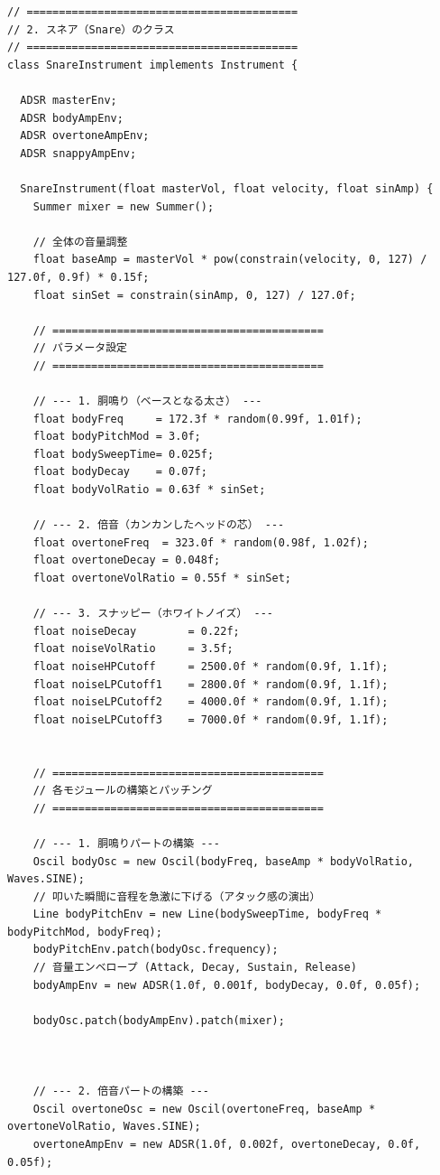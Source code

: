 \begin{lstlisting}[caption={Drum.pde}, label={lst:proc_drum}]
// ==========================================
// 2. スネア（Snare）のクラス
// ==========================================
class SnareInstrument implements Instrument {
  
  ADSR masterEnv;
  ADSR bodyAmpEnv;
  ADSR overtoneAmpEnv;
  ADSR snappyAmpEnv;

  SnareInstrument(float masterVol, float velocity, float sinAmp) {
    Summer mixer = new Summer();
    
    // 全体の音量調整
    float baseAmp = masterVol * pow(constrain(velocity, 0, 127) / 127.0f, 0.9f) * 0.15f; 
    float sinSet = constrain(sinAmp, 0, 127) / 127.0f;
    
    // ==========================================
    // パラメータ設定
    // ==========================================
    
    // --- 1. 胴鳴り（ベースとなる太さ） ---
    float bodyFreq     = 172.3f * random(0.99f, 1.01f);
    float bodyPitchMod = 3.0f;
    float bodySweepTime= 0.025f;
    float bodyDecay    = 0.07f;
    float bodyVolRatio = 0.63f * sinSet;
    
    // --- 2. 倍音（カンカンしたヘッドの芯） ---
    float overtoneFreq  = 323.0f * random(0.98f, 1.02f);
    float overtoneDecay = 0.048f;
    float overtoneVolRatio = 0.55f * sinSet;
    
    // --- 3. スナッピー（ホワイトノイズ） ---
    float noiseDecay        = 0.22f;
    float noiseVolRatio     = 3.5f;
    float noiseHPCutoff     = 2500.0f * random(0.9f, 1.1f);
    float noiseLPCutoff1    = 2800.0f * random(0.9f, 1.1f);
    float noiseLPCutoff2    = 4000.0f * random(0.9f, 1.1f);
    float noiseLPCutoff3    = 7000.0f * random(0.9f, 1.1f);


    // ==========================================
    // 各モジュールの構築とパッチング
    // ==========================================
    
    // --- 1. 胴鳴りパートの構築 ---
    Oscil bodyOsc = new Oscil(bodyFreq, baseAmp * bodyVolRatio, Waves.SINE);
    // 叩いた瞬間に音程を急激に下げる（アタック感の演出）
    Line bodyPitchEnv = new Line(bodySweepTime, bodyFreq * bodyPitchMod, bodyFreq);
    bodyPitchEnv.patch(bodyOsc.frequency);
    // 音量エンベロープ (Attack, Decay, Sustain, Release)
    bodyAmpEnv = new ADSR(1.0f, 0.001f, bodyDecay, 0.0f, 0.05f);
    
    bodyOsc.patch(bodyAmpEnv).patch(mixer);
    
    

    // --- 2. 倍音パートの構築 ---
    Oscil overtoneOsc = new Oscil(overtoneFreq, baseAmp * overtoneVolRatio, Waves.SINE);
    overtoneAmpEnv = new ADSR(1.0f, 0.002f, overtoneDecay, 0.0f, 0.05f);
    

\end{lstlisting}
